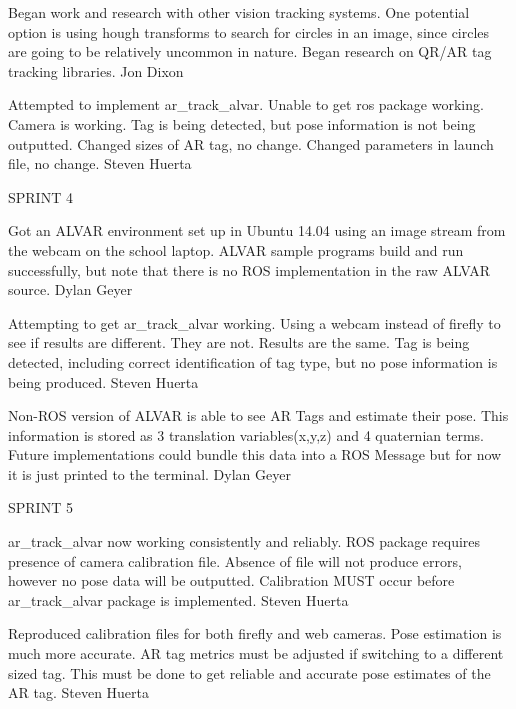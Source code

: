 \begin{description}
\item[11/23/15] Began work and research with other vision tracking systems. One potential option is using hough transforms to search for circles in an image, since circles are going to be relatively uncommon in nature. Began research on QR/AR tag tracking libraries. \hfill{Jon Dixon}

\item [12/28/15]  Attempted to implement ar\_track\_alvar. Unable to get ros package working. Camera is working. Tag is being detected, but pose information is not being outputted. Changed sizes of AR tag, no change. Changed parameters in launch file, no change. \hfill{Steven Huerta}

\item SPRINT 4

\item [1/18/16] Got an ALVAR environment set up in Ubuntu 14.04 using an image stream from the webcam on the school laptop. ALVAR sample programs build and run successfully, but note that there is no ROS implementation in the raw ALVAR source.  \hfill{Dylan Geyer}

\item [1/25/16]  Attempting to get ar\_track\_alvar working. Using a webcam instead of firefly to see if results are different. They are not. Results are the same. Tag is being detected, including correct identification of tag type, but no pose information is being produced.  \hfill{Steven Huerta}


\item [2/1/16]  Non-ROS version of ALVAR is able to see AR Tags and estimate their pose. This information is stored as 3 translation variables(x,y,z) and 4 quaternian terms. Future implementations could bundle this data into a ROS Message but for now it is just printed to the terminal. \hfill{Dylan Geyer}

\item SPRINT 5

\item [2/15/16]  ar\_track\_alvar now working consistently and reliably. ROS package requires presence of camera calibration file. Absence of file will not produce errors, however no pose data will be outputted. Calibration MUST occur before ar\_track\_alvar package is implemented. \hfill{Steven Huerta}

\item [2/22/16]  Reproduced calibration files for both firefly and web cameras. Pose estimation is much more accurate. AR tag metrics must be adjusted if switching to a different sized tag. This must be done to get reliable and accurate pose estimates of the AR tag. \hfill{Steven Huerta}


\end{description}
